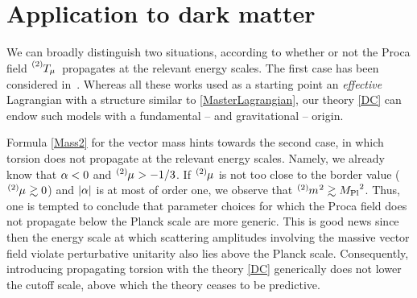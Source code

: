 \documentclass[aps,prd,reprint,preprintnumbers,showpacs,floatfix,nofootinbib,superscript address,longbibliography]{revtex4-1}
\begin{document}
\section{Application to dark matter}


We can broadly distinguish two situations, according to whether or not the Proca field $\T[2]{_{\mu}}$ propagates at the relevant energy scales. The first case has been considered in~\cite{Ford:1989me,Golovnev:2008cf,Chiba:2008eh,Koivisto:2008xf,Kanno:2008gn,Emami:2016ldl,Armendariz-Picon:2004say,Koivisto:2007bp,Koivisto:2008xf,Tasinato:2014eka,DeFelice:2016yws,DeFelice:2016uil,BeltranJimenez:2016afo,deFelice:2017paw,Nakamura:2018oyy,Heisenberg:2020xak,Benisty:2021sul,deRham:2021efp,Hambye:2008bq,Hambye:2009fg,Arina:2009uq,Hisano:2010yh,Diaz-Cruz:2010czr,Lebedev:2011iq,Farzan:2012hh,Baek:2012se,Arcadi:2020jqf,Barman:2021qds,Bekenstein:1971hc,Heisenberg:2017hwb,Garcia-Saenz:2021uyv}. Whereas all these works used as a starting point an \emph{effective} Lagrangian with a structure similar to \cref{MasterLagrangian}, our theory \eqref{DC} can endow such models with a fundamental -- and gravitational -- origin.


Formula \eqref{Mass2} for the vector mass hints towards the second case, in which torsion does not propagate at the relevant energy scales. Namely, we already know that $\alp{5}<0$ and $\bet{2}>-1/3$. If $\bet{2}$ is not too close to the border value (\eg $\bet{2}\gtrsim0$) and $|\alp{5}|$ is at most of order one, we observe that $\mass[2]{}^2 \gtrsim \Planck^2$. Thus, one is tempted to conclude that parameter choices for which the Proca field does not propagate below the Planck scale are more generic. This is good news since then the energy scale at which scattering amplitudes involving the massive vector field violate perturbative unitarity also lies above the Planck scale. Consequently, introducing propagating torsion with the theory \eqref{DC} generically does not lower the cutoff scale, above which the theory ceases to be predictive. 
\end{document}
